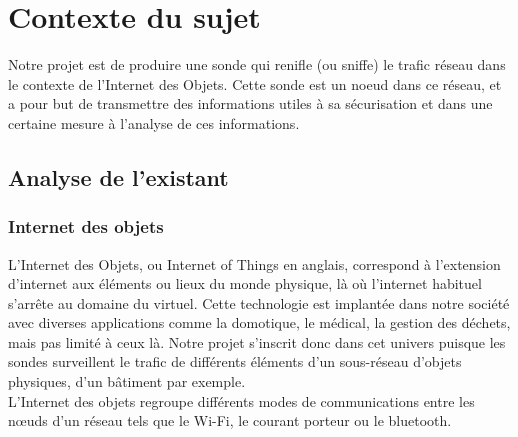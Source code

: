 \chapter{Contexte du sujet}
\label{chap:contexte}
	Notre projet est de produire une sonde qui renifle (ou sniffe) le trafic réseau dans le contexte de l'Internet des Objets. Cette sonde est un noeud dans ce réseau, et a pour but de transmettre des informations utiles à sa sécurisation et dans une certaine mesure à l'analyse de ces informations.

\section{Analyse de l'existant}
	
	\subsection{Internet des objets}
		L'Internet des Objets, ou Internet of Things en anglais, correspond à l'extension d'internet aux éléments ou lieux du monde physique, là où l'internet habituel s'arrête au domaine du virtuel.
		Cette technologie est implantée dans notre société avec diverses applications comme la domotique, le médical, la gestion des déchets, mais pas limité à ceux là.
		Notre projet s'inscrit donc dans cet univers puisque les sondes surveillent le trafic de différents éléments d'un sous-réseau d'objets physiques, d'un bâtiment par exemple. \\
		L'Internet des objets regroupe différents modes de communications entre les nœuds d'un réseau tels que le Wi-Fi, le courant porteur ou le bluetooth.%
		
